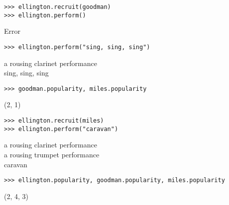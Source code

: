 \begin{blocksection}
\begin{lstlisting}
>>> ellington.recruit(goodman)
>>> ellington.perform()
\end{lstlisting}
\begin{solution}[.2in]
Error
\end{solution}

\vspace{1\baselineskip}

\begin{lstlisting}
>>> ellington.perform("sing, sing, sing")
\end{lstlisting}
\begin{solution}[.2in]
a rousing clarinet performance \\
sing, sing, sing
\end{solution}

\vspace{2\baselineskip}

\begin{lstlisting}
>>> goodman.popularity, miles.popularity
\end{lstlisting}
\begin{solution}[.2in]
(2, 1)
\end{solution}

\vspace{1\baselineskip}

\begin{lstlisting}
>>> ellington.recruit(miles)
>>> ellington.perform("caravan")
\end{lstlisting}
\begin{solution}[.2in]
a rousing clarinet performance\\
a rousing trumpet performance\\
caravan
\end{solution}

\vspace{2\baselineskip}

\begin{lstlisting}
>>> ellington.popularity, goodman.popularity, miles.popularity
\end{lstlisting}
\begin{solution}[.2in]
(2, 4, 3)
\end{solution}

\vspace{2\baselineskip}


\end{blocksection}
